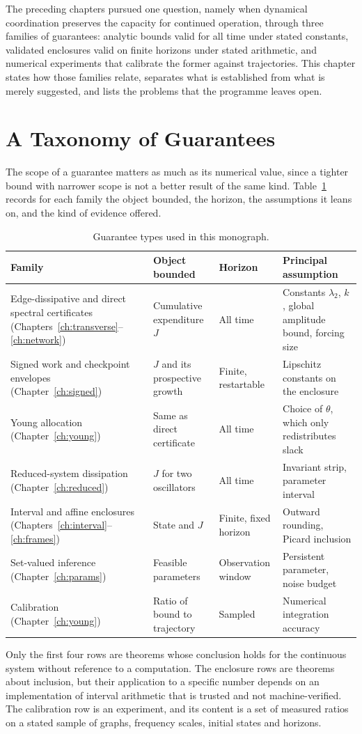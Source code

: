 \documentclass[11pt,notitlepage]{report}
\theoremstyle{definition}
\theoremstyle{remark}
\begin{document}
The preceding chapters pursued one question, namely when dynamical coordination preserves the capacity for continued operation, through three families of guarantees: analytic bounds valid for all time under stated constants, validated enclosures valid on finite horizons under stated arithmetic, and numerical experiments that calibrate the former against trajectories. This chapter states how those families relate, separates what is established from what is merely suggested, and lists the problems that the programme leaves open.

\section{A Taxonomy of Guarantees}
The scope of a guarantee matters as much as its numerical value, since a tighter bound with narrower scope is not a better result of the same kind. Table~\ref{tab:taxonomy} records for each family the object bounded, the horizon, the assumptions it leans on, and the kind of evidence offered.
\begin{table}[ht]\centering\small
\caption{Guarantee types used in this monograph.}\label{tab:taxonomy}
\begin{tabular}{@{}p{3.2cm}p{2.6cm}p{2.2cm}p{4.4cm}@{}}\toprule
Family&Object bounded&Horizon&Principal assumption\\\midrule
Edge-dissipative and direct spectral certificates (Chapters~\ref{ch:transverse}--\ref{ch:network})&Cumulative expenditure $J$&All time&Constants $\lambda_2$, $k$, global amplitude bound, forcing size\\
Signed work and checkpoint envelopes (Chapter~\ref{ch:signed})&$J$ and its prospective growth&Finite, restartable&Lipschitz constants on the enclosure\\
Young allocation (Chapter~\ref{ch:young})&Same as direct certificate&All time&Choice of $\theta$, which only redistributes slack\\
Reduced-system dissipation (Chapter~\ref{ch:reduced})&$J$ for two oscillators&All time&Invariant strip, parameter interval\\
Interval and affine enclosures (Chapters~\ref{ch:interval}--\ref{ch:frames})&State and $J$&Finite, fixed horizon&Outward rounding, Picard inclusion\\
Set-valued inference (Chapter~\ref{ch:params})&Feasible parameters&Observation window&Persistent parameter, noise budget\\
Calibration (Chapter~\ref{ch:young})&Ratio of bound to trajectory&Sampled&Numerical integration accuracy\\\bottomrule
\end{tabular}
\end{table}
Only the first four rows are theorems whose conclusion holds for the continuous system without reference to a computation. The enclosure rows are theorems about inclusion, but their application to a specific number depends on an implementation of interval arithmetic that is trusted and not machine-verified. The calibration row is an experiment, and its content is a set of measured ratios on a stated sample of graphs, frequency scales, initial states and horizons.
\end{document}
